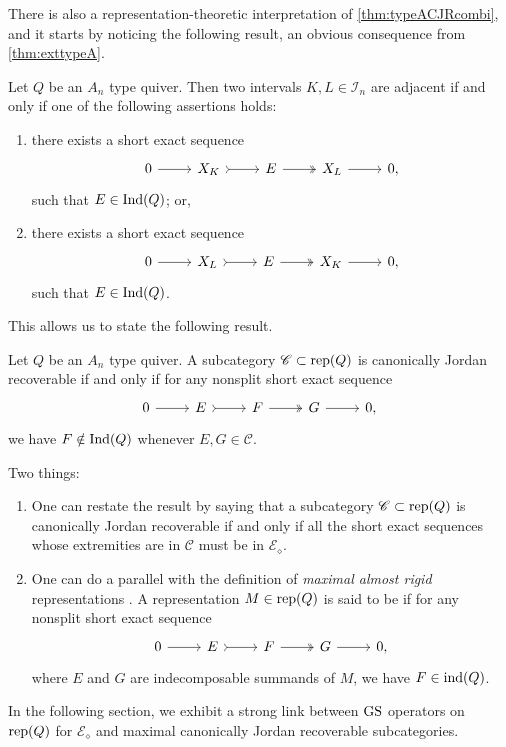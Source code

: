 There is also a representation-theoretic interpretation of \cref{thm:typeACJRcombi}, and it starts by noticing the following result, an obvious consequence from \cref{thm:exttypeA}.

\begin{lemma} \label{lem:adj=arrow} Let $Q$ be an $A_n$ type quiver. Then two intervals $K,L \in \mathcal{I}_n$ are adjacent if and only if one of the following assertions holds:
\begin{enumerate}[label=$\bullet$, itemsep=1mm]
    \item there exists a short exact sequence \[\begin{tikzcd}
	0 & X_K & E  & X_L&  0,
	\arrow[from=1-1, to=1-2]
	\arrow[tail, from=1-2, to=1-3]
	\arrow[two heads,from=1-3, to=1-4]
	\arrow[from=1-4, to=1-5]
\end{tikzcd} \] such that $E \in \operatorname{Ind}(Q)$; or,
    \item there exists a short exact sequence \[\begin{tikzcd}
	0 & X_L & E  & X_K&  0,
	\arrow[from=1-1, to=1-2]
	\arrow[tail, from=1-2, to=1-3]
	\arrow[two heads,from=1-3, to=1-4]
	\arrow[from=1-4, to=1-5]
\end{tikzcd} \] such that $E \in \operatorname{Ind}(Q)$.
\end{enumerate}
\end{lemma}

This allows us to state the following result.

 \begin{theorem} \label{thm:CJRreptheory}
     Let $Q$ be an $A_n$ type quiver. A subcategory $\mathscr{C} \subset \operatorname{rep}(Q)$ is canonically Jordan recoverable if and only if for any nonsplit short exact sequence \[\begin{tikzcd}
	0 & E & F  & G &  0,
	\arrow[from=1-1, to=1-2]
	\arrow[tail, from=1-2, to=1-3]
	\arrow[two heads,from=1-3, to=1-4]
	\arrow[from=1-4, to=1-5]
\end{tikzcd}\] we have $F \notin \operatorname{Ind}(Q)$ whenever $E,G \in \mathscr{C}$.
 \end{theorem}

\begin{remark}\label{rem:TwoThings} Two things:
\begin{enumerate}[label=$\bullet$,itemsep=1mm]
    \item One can restate the result by saying that a subcategory $\mathscr{C} \subset \operatorname{rep}(Q)$ is canonically Jordan recoverable if and only if all the short exact sequences whose extremities are in $\mathscr{C}$ must be in $\mathcal{E}_\diamond$.
    \item One can do a parallel with the definition of \emph{maximal almost rigid} representations \cite{BGMS23}. A representation $M \in \operatorname{rep}(Q)$ is said to be  if for any nonsplit short exact sequence \[\begin{tikzcd}
	0 & E & F  & G &  0,
	\arrow[from=1-1, to=1-2]
	\arrow[tail, from=1-2, to=1-3]
	\arrow[two heads,from=1-3, to=1-4]
	\arrow[from=1-4, to=1-5]
\end{tikzcd}\] where $E$ and $G$ are indecomposable summands of $M$, we have $F \in \operatorname{ind}(Q)$.
\end{enumerate}
\end{remark}

In the following section, we exhibit a strong link between $\operatorname{GS}$ operators on $\operatorname{rep}(Q)$ for  $\mathcal{E}_\diamond$ and maximal canonically Jordan recoverable subcategories.